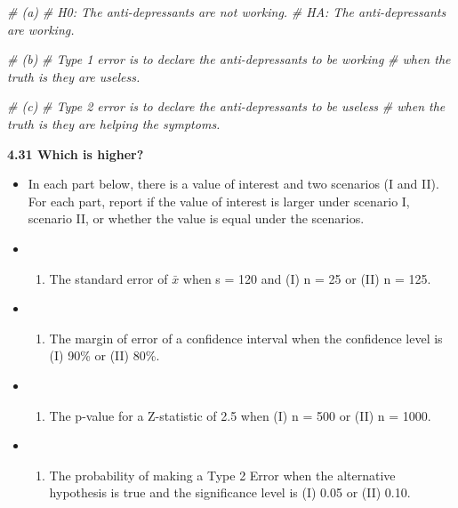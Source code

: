 \documentclass[]{book}
\newenvironment{Shaded}{\begin{snugshade}}{\end{snugshade}}
\newcommand{\CommentTok}[1]{\textcolor[rgb]{0.56,0.35,0.01}{\textit{#1}}}
\providecommand{\tightlist}{%
  \setlength{\itemsep}{0pt}\setlength{\parskip}{0pt}}
\begin{document}
\begin{Shaded}
\begin{Highlighting}[]
\CommentTok{# (a)}
\CommentTok{# H0: The anti-depressants are not working.}
\CommentTok{# HA: The anti-depressants are working.}
\end{Highlighting}
\end{Shaded}

\begin{Shaded}
\begin{Highlighting}[]
\CommentTok{# (b)}
\CommentTok{# Type 1 error is to declare the anti-depressants to be working }
\CommentTok{# when the truth is they are useless.}
\end{Highlighting}
\end{Shaded}

\begin{Shaded}
\begin{Highlighting}[]
\CommentTok{# (c)}
\CommentTok{# Type 2 error is to declare the anti-depressants to be useless}
\CommentTok{# when the truth is they are helping the symptoms.}
\end{Highlighting}
\end{Shaded}

\textbf{4.31 Which is higher?}

\begin{itemize}
\item
  In each part below, there is a value of interest and two scenarios (I and
  II). For each part, report if the value of interest is larger under scenario I, scenario II, or whether
  the value is equal under the scenarios.
\item
  \begin{enumerate}
  \def\labelenumi{(\alph{enumi})}
  \tightlist
  \item
    The standard error of \(\bar{x}\) when s = 120 and (I) n = 25 or (II) n = 125.
  \end{enumerate}
\item
  \begin{enumerate}
  \def\labelenumi{(\alph{enumi})}
  \setcounter{enumi}{1}
  \tightlist
  \item
    The margin of error of a confidence interval when the confidence level is (I) 90\% or (II) 80\%.
  \end{enumerate}
\item
  \begin{enumerate}
  \def\labelenumi{(\alph{enumi})}
  \setcounter{enumi}{2}
  \tightlist
  \item
    The p-value for a Z-statistic of 2.5 when (I) n = 500 or (II) n = 1000.
  \end{enumerate}
\item
  \begin{enumerate}
  \def\labelenumi{(\alph{enumi})}
  \setcounter{enumi}{3}
  \tightlist
  \item
    The probability of making a Type 2 Error when the alternative hypothesis is true and the
    significance level is (I) 0.05 or (II) 0.10.
  \end{enumerate}
\end{itemize}
\end{document}
